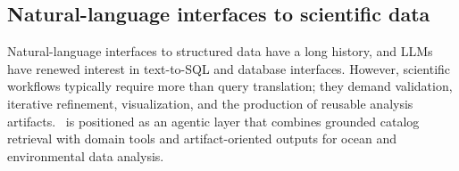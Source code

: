 \subsection{Natural-language interfaces to scientific data}
Natural-language interfaces to structured data have a long history, and LLMs have renewed interest in text-to-SQL and database interfaces.
However, scientific workflows typically require more than query translation; they demand validation, iterative refinement, visualization, and the production of reusable analysis artifacts.
\cmapagent\ is positioned as an agentic layer that combines grounded catalog retrieval with domain tools and artifact-oriented outputs for ocean and environmental data analysis.

